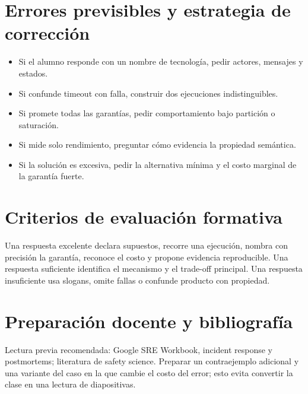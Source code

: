 \documentclass[variant=docente,cover=institutional,mode=screen]{ua-engineering-v6-article}
\begin{document}
\section{Errores previsibles y estrategia de corrección}
\begin{itemize}
\item Si el alumno responde con un nombre de tecnología, pedir actores, mensajes y estados.
\item Si confunde timeout con falla, construir dos ejecuciones indistinguibles.
\item Si promete todas las garantías, pedir comportamiento bajo partición o saturación.
\item Si mide solo rendimiento, preguntar cómo evidencia la propiedad semántica.
\item Si la solución es excesiva, pedir la alternativa mínima y el costo marginal de la garantía fuerte.
\end{itemize}

\section{Criterios de evaluación formativa}
Una respuesta excelente declara supuestos, recorre una ejecución, nombra con precisión la garantía, reconoce el costo y propone evidencia reproducible. Una respuesta suficiente identifica el mecanismo y el trade-off principal. Una respuesta insuficiente usa slogans, omite fallas o confunde producto con propiedad.

\section{Preparación docente y bibliografía}
Lectura previa recomendada: Google SRE Workbook, incident response y postmortems; literatura de safety science. Preparar un contraejemplo adicional y una variante del caso en la que cambie el costo del error; esto evita convertir la clase en una lectura de diapositivas.
\end{document}
